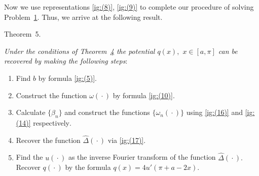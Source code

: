 Now we use representations \eqref{ig:(8)}, \eqref{ig:(9)}  to complete our procedure of solving Problem~\hyperlink{ign:problem1}{1}. Thus, we arrive at the following result.



\smallskip



{\small\sc Theorem~5.} {\it Under the conditions of Theorem~{\rm \hyperlink{ign:th4}{4}} the potential $q(x),$ $x\in[a,\pi]$ can be recovered by making the following steps\/${:}$

\begin{enumerate}

  \item[\rm 1.] Find $b$ by formula {\rm \eqref{ig:(5)}.}

  \item[\rm 2.] Construct the function $\omega({}\cdot{})$ by formula {\rm \eqref{ig:(10)}.}

  \item[\rm 3.] Calculate $\{\beta_n\}$ and construct the functions $\{\omega_n({}\cdot{})\}$ using \eqref{ig:(16)} and \eqref{ig:(14)}  respectively$.$

  \item[\rm 4.] Recover the function $\hat\Delta({}\cdot{})$ via {\rm  \eqref{ig:(17)}.}

  \item[\rm 5.] Find the $u({}\cdot{})$ as the inverse Fourier transform of the function $\hat\Delta({}\cdot{}).$ Recover $q({}\cdot{})$ by the formula   $q(x)=4u'(\pi+a-2x).$

\end{enumerate}



}




















